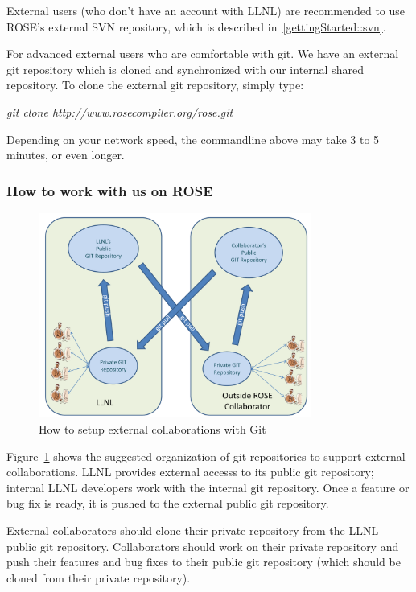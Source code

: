 External users (who don't have an account with LLNL) are recommended to use
ROSE's external SVN repository, which is described
in~\ref{gettingStarted::svn}.

For advanced external users who are comfortable with git. 
We have an external git repository which is cloned and synchronized with our internal shared repository. 
To clone the external git repository, simply type:

\textit{git clone http://www.rosecompiler.org/rose.git}

\noindent Depending on your network speed, the commandline above may take 3 to 5
minutes, or even longer.

\subsubsection{How to work with us on ROSE}

\begin{figure}[htbp]  
  \centering
    \includegraphics[width=0.8\textwidth]{git_collaboration_diagram.pdf}
  \caption{How to setup external collaborations with Git}
  \label{fig:rose-git-collaborations}
\end{figure}

Figure~\ref{fig:rose-git-collaborations} shows the suggested organization of 
git repositories to support external collaborations.  LLNL provides 
external accesss to its public git repository; internal LLNL
developers work with the internal git repository. Once a feature or 
bug fix is ready, it is pushed to the external public git 
repository. 

External collaborators should clone their private repository from
the LLNL public git repository.  Collaborators should work on their
private repository and push their features and bug fixes to their
public git repository (which should be cloned from their private
repository).

